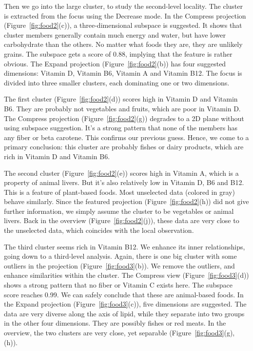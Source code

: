 Then we go into the large cluster, to study the second-level locality. The cluster is extracted from the focus using the Decrease mode. In the Compress projection (Figure~\ref{fig:food2}(c)), a three-dimensional subspace is suggested. It shows that cluster members generally contain much energy and water, but have lower carbohydrate than the others. No matter what foods they are, they are unlikely grains. The subspace gets a score of 0.88, implying that the feature is rather obvious. The Expand projection (Figure~\ref{fig:food2}(b)) has four suggested dimensions: Vitamin D, Vitamin B6, Vitamin A and Vitamin B12. The focus is divided into three smaller clusters, each dominating one or two dimensions.

The first cluster (Figure~\ref{fig:food2}(d)) scores high in Vitamin D and Vitamin B6. They are probably not vegetables and fruits, which are poor in Vitamin D. The Compress projection (Figure~\ref{fig:food2}(g)) degrades to a 2D plane without using subspace suggestion. It's a strong pattern that none of the members has any fiber or beta carotene. This confirms our previous guess. Hence, we come to a primary conclusion: this cluster are probably fishes or dairy products, which are rich in Vitamin D and Vitamin B6.

The second cluster (Figure~\ref{fig:food2}(e)) scores high in Vitamin A, which is a property of animal livers. But it's also relatively low in Vitamin D, B6 and B12. This is a feature of plant-based foods. Most unselected data (colored in gray) behave similarly. Since the featured projection (Figure~\ref{fig:food2}(h)) did not give further information, we simply assume the cluster to be vegetables or animal livers. Back in the overview (Figure~\ref{fig:food2}(j)), these data are very close to the unselected data, which coincides with the local observation.

The third cluster seems rich in Vitamin B12. We enhance its inner relationships, going down to a third-level analysis. Again, there is one big cluster with some outliers in the projection (Figure~\ref{fig:food3}(b)). We remove the outliers, and enhance similarities within the cluster. The Compress view (Figure~\ref{fig:food3}(d)) shows a strong pattern that no fiber or Vitamin C exists here. The subspace score reaches 0.99. We can safely conclude that these are animal-based foods. In the Expand projection (Figure~\ref{fig:food3}(c)), five dimensions are suggested. The data are very diverse along the axis of lipid, while they separate into two groups in the other four dimensions. They are possibly fishes or red meats. In the overview, the two clusters are very close, yet separable (Figure~\ref{fig:food3}(g), (h)).

